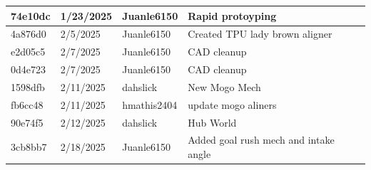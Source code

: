 \begin{center}
\begin{longtable}{|p{28pt}|p{33pt}|p{40pt}|p{300pt}|}
\hline
74e10dc & 1/23/2025 & Juanle6150 & Rapid protoyping \\
\hline
4a876d0 & 2/5/2025 & Juanle6150 & Created TPU lady brown aligner \\
\hline
e2d05c5 & 2/7/2025 & Juanle6150 & CAD cleanup \\
\hline
0d4e723 & 2/7/2025 & Juanle6150 & CAD cleanup \\
\hline
1598dfb & 2/11/2025 & dahslick & New Mogo Mech \\
\hline
fb6cc48 & 2/11/2025 & hmathis2404 & update mogo aliners \\
\hline
90e74f5 & 2/12/2025 & dahslick & Hub World \\
\hline
3cb8bb7 & 2/18/2025 & Juanle6150 & Added goal rush mech and intake angle \\
\hline
\end{longtable}
\end{center}
